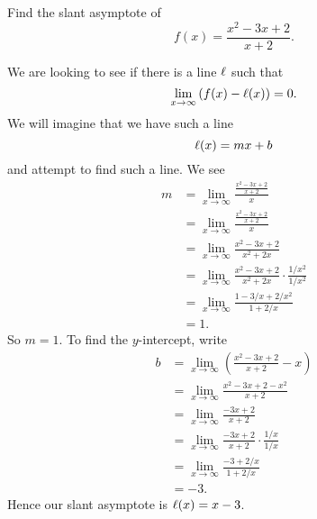 \documentclass{ximera}
\begin{document}
\begin{example}
  Find the slant asymptote of
  \[
f(x) = \frac{x^2-3x+2}{x+2}.
  \]
  \begin{explanation}
    We are looking to see if there is a line $\ell$ such that
    \[
    \lim_{x\to \infty}\left(f(x) - \l(x)\right) = 0.
    \]
    We will imagine that we have such a line
    \[
    \ell(x) = mx + b
    \]
    and attempt to find such a line. We see
    \begin{align*}
      m &=\lim_{x\to\infty}\frac{\frac{x^2-3x+2}{x+2}}{x}\\
      &= \lim_{x\to\infty}\frac{\frac{x^2-3x+2}{x+2}}{x}\\
      &= \lim_{x\to\infty}\frac{x^2-3x+2}{x^2+2x}\\
      &= \lim_{x\to\infty}\frac{x^2-3x+2}{x^2+2x}\cdot\frac{1/x^2}{1/x^2}\\
      &= \lim_{x\to\infty}\frac{1-3/x+2/x^2}{1+2/x}\\
      &= 1.
    \end{align*}
    So $m=1$. To find the $y$-intercept, write
    \begin{align*}
      b &=\lim_{x\to\infty} \left(\frac{x^2-3x+2}{x+2} - x\right)\\
      &=\lim_{x\to\infty} \frac{x^2-3x+2-x^2}{x+2}\\
      &=\lim_{x\to\infty} \frac{-3x+2}{x+2}\\
      &=\lim_{x\to\infty} \frac{-3x+2}{x+2}\cdot\frac{1/x}{1/x}\\
      &=\lim_{x\to\infty} \frac{-3+2/x}{1+2/x}\\
      &= -3.
    \end{align*}
    Hence our slant asymptote is $\ell(x) = x-3$.
  \end{explanation}
\end{example}
\end{document}
